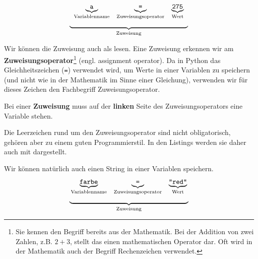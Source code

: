 \[
\begin{array}[t]{c}
\begin{array}[t]{ccc}
\underbrace{\textrm{\texttt{a}}}_{\textrm{Variablenname}} & \underbrace{\textrm{\texttt{=}}}_{\textrm{Zuweisungsoperator}} & \underbrace{\textrm{\texttt{275}}}_{\textrm{Wert}}
\end{array} \\
\underbrace{\hspace{6cm}}_{\textrm{Zuweisung}}
\end{array}
\]

Wir können die Zuweisung auch als  lesen. Eine Zuweisung erkennen wir am \textbf{Zuweisungsoperator}\footnote{Sie kennen den Begriff bereits aus der Mathematik. Bei der Addition von zwei Zahlen, z.B. $2 + 3$, stellt das  einen mathematischen Operator dar. Oft wird in der Mathematik auch der Begriff Rechenzeichen verwendet.} (engl. assignment operator). Da in Python das Gleichheitszeichen (\lstinline[language={python3}]{=}) verwendet wird, um Werte in einer Variablen zu speichern (und nicht wie in der Mathematik im Sinne einer Gleichung), verwenden wir für dieses Zeichen den Fachbegriff Zuweisungsoperator.

\begin{important}
Bei einer \textbf{Zuweisung} muss auf der \textbf{linken} Seite des Zuweisungsoperators eine Variable stehen.
\end{important}


Die Leerzeichen rund um den Zuweisungsoperator sind nicht obligatorisch, gehören aber zu einem guten Programmierstil. In den Listings werden sie daher auch mit \texttt{} dargestellt.

\begin{example}
Wir können natürlich auch einen String in einer Variablen speichern.
\[
\begin{array}[t]{c}
\begin{array}[t]{ccc}
\underbrace{\textrm{\texttt{farbe}}}_{\textrm{Variablenname}} & \underbrace{\textrm{\texttt{=}}}_{\textrm{Zuweisungsoperator}} & \underbrace{\textrm{\texttt{"red"}}}_{\textrm{Wert}}
\end{array} \\
\underbrace{\hspace{6cm}}_{\textrm{Zuweisung}}
\end{array}
\]
\end{example}



